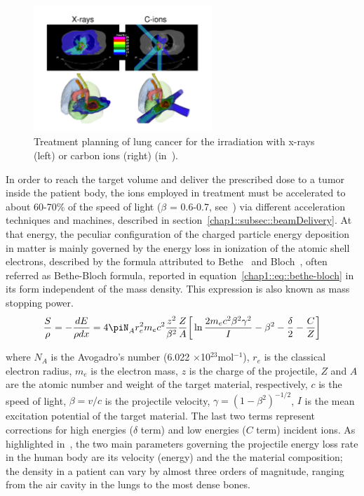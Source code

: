 \begin{figure}[!htbp]
\centering
\includegraphics[width=0.6\textwidth]{03_GraphicFiles/chapter1_Introduction/xRayCions_fields.pdf}
\caption{Treatment planning of lung cancer for the irradiation with x-rays (left) or carbon ions (right) (in~\cite{Durante2016}).}
\label{chap1::fig::XraysCionsFields}
\end{figure} 

In order to reach the target volume and deliver the prescribed dose to a tumor inside the patient body, the ions employed in treatment must be accelerated to about 60-70\% of the speed of light ($\beta$ = 0.6-0.7, see~\cite{Durante2016}) via different acceleration techniques and machines, described in section~\ref{chap1::subsec::beamDelivery}. At that energy, the peculiar configuration of the charged particle energy deposition in matter is mainly governed by the energy loss in ionization of the atomic shell electrons, described by the formula attributed to Bethe~\parencite{Bethe1930} and Bloch~\parencite{Bloch1933}, often referred as Bethe-Bloch formula, reported in equation~\ref{chap1::eq::bethe-bloch} in its form independent of the mass density. This expression is also known as mass stopping power.\\
  
\begin{equation}
\frac{S}{\rho} = -\frac{dE}{\rho dx} = 4\piN_{A}r^{2}_{e}m_{e}c^{2}\frac{z^{2}}{\beta^{2}}\frac{Z}{A}\bigg[\ln{\frac{2m_{e}c^{2}\beta^{2}\gamma^{2}}{I}}-\beta^{2}-\frac{\delta}{2}-\frac{C}{Z}\bigg]
\label{chap1::eq::bethe-bloch}
\end{equation}

where $N_{A}$ is the Avogadro's number (6.022 $\times$10$^{23}$mol$^{-1}$), $r_{e}$ is the classical electron radius, $m_{e}$ is the electron mass, $z$ is the charge of the projectile, $Z$ and $A$ are the atomic number and weight of the target material, respectively, $c$ is the speed of light, $\beta = v/c$ is the projectile velocity, $\gamma = (1-\beta^{2})^{-1/2}$, $I$ is the mean excitation potential of the target material. The last two terms represent corrections for high energies ($\delta$ term) and low energies ($C$ term) incident ions. As highlighted in~\cite{Newhauser2015}, the two main parameters governing the projectile energy loss rate in the human body are its velocity (energy) and the the material composition; the density in a patient can vary by almost three orders of magnitude, ranging from the air cavity in the lungs to the most dense bones. 

